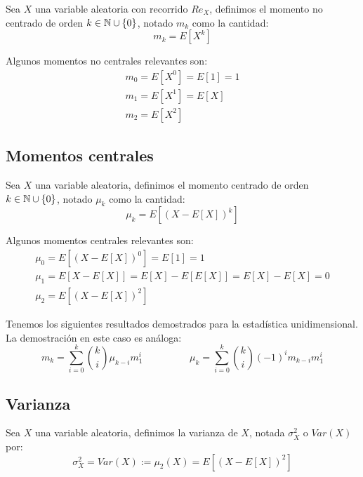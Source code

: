 \begin{definicion}
    Sea $X$ una variable aleatoria con recorrido $Re_X$, definimos el momento no centrado de orden $k \in \mathbb N \cup \{0\}$, notado $m_k$ como la cantidad:
    $$m_k = E[X^k]$$
\end{definicion}

Algunos momentos no centrales relevantes son:
$$\begin{array}{l}
    m_0 = E[X^0] = E[1] = 1 \\
    m_1 = E[X^1] = E[X]     \\
    m_2 = E[X^2]
\end{array}$$

\subsection{Momentos centrales}

\begin{definicion}
    Sea $X$ una variable aleatoria, definimos el momento centrado de orden $k \in \mathbb N \cup \{0\}$, notado $\mu_k$ como la cantidad:
    $$\mu_k = E[(X - E[X])^k]$$
\end{definicion}

Algunos momentos centrales relevantes son:
$$\begin{array}{l}
    \mu_0 = E[(X-E[X])^0] = E[1] = 1                     \\
    \mu_1 = E[X-E[X]] = E[X] - E[E[X]] = E[X] - E[X] = 0 \\
    \mu_2 = E[(X-E[X])^2]
  \end{array}$$

Tenemos los siguientes resultados demostrados para la estadística unidimensional. La demostración en este caso es análoga:
\begin{equation*}
    m_{k} = \sum_{i=0}^k\binom{k}{i} \mu_{k-i}m_1^i
    \hspace{2cm}
    \mu_{k} = \sum_{i=0}^k\binom{k}{i} (-1)^i m_{k-i} m_1^i
\end{equation*}

\subsection{Varianza}
\begin{definicion}
    Sea $X$ una variable aleatoria, definimos la varianza de $X$, notada $\sigma_X^2$ o $Var(X)$ por:
    $$\sigma_X^2 = Var(X) := \mu_2(X) = E[(X-E[X])^2]$$
\end{definicion}



